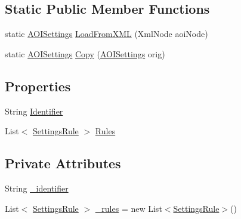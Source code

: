\subsection*{Static Public Member Functions}
\begin{DoxyCompactItemize}
\item 
static \hyperlink{class_web_analyzer_1_1_models_1_1_settings_model_1_1_a_o_i_settings}{A\+O\+I\+Settings} \hyperlink{class_web_analyzer_1_1_models_1_1_settings_model_1_1_a_o_i_settings_ae2ef2eeabecd6cd2dbb8427370fa4ff0}{Load\+From\+X\+M\+L} (Xml\+Node aoi\+Node)
\item 
static \hyperlink{class_web_analyzer_1_1_models_1_1_settings_model_1_1_a_o_i_settings}{A\+O\+I\+Settings} \hyperlink{class_web_analyzer_1_1_models_1_1_settings_model_1_1_a_o_i_settings_a85c137ff1741cbd292804cb3ec94eca3}{Copy} (\hyperlink{class_web_analyzer_1_1_models_1_1_settings_model_1_1_a_o_i_settings}{A\+O\+I\+Settings} orig)
\end{DoxyCompactItemize}
\subsection*{Properties}
\begin{DoxyCompactItemize}
\item 
String \hyperlink{class_web_analyzer_1_1_models_1_1_settings_model_1_1_a_o_i_settings_a6fee5ecaba688289bfd5795367250339}{Identifier}
\item 
List$<$ \hyperlink{class_web_analyzer_1_1_models_1_1_settings_model_1_1_settings_rule}{Settings\+Rule} $>$ \hyperlink{class_web_analyzer_1_1_models_1_1_settings_model_1_1_a_o_i_settings_a8852191a79accfc1288d0fb6a2b4a14c}{Rules}
\end{DoxyCompactItemize}
\subsection*{Private Attributes}
\begin{DoxyCompactItemize}
\item 
String \hyperlink{class_web_analyzer_1_1_models_1_1_settings_model_1_1_a_o_i_settings_aaad4690527bd5ad5075cd87df38b249e}{\+\_\+identifier}
\item 
List$<$ \hyperlink{class_web_analyzer_1_1_models_1_1_settings_model_1_1_settings_rule}{Settings\+Rule} $>$ \hyperlink{class_web_analyzer_1_1_models_1_1_settings_model_1_1_a_o_i_settings_a36ff6cc7414c41d4b619b3101977ff4c}{\+\_\+rules} = new List$<$\hyperlink{class_web_analyzer_1_1_models_1_1_settings_model_1_1_settings_rule}{Settings\+Rule}$>$()
\end{DoxyCompactItemize}


